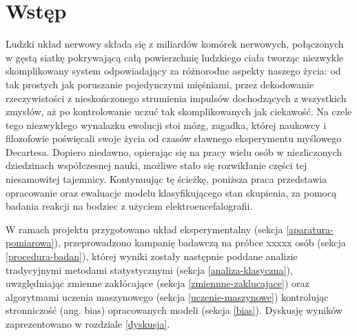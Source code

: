 \documentclass{./assets/wfis}
\begin{document}

\stronatytulowa

\begin{abstract}

\end{abstract}

\chapter{Wstęp}
Ludzki układ nerwowy składa się z miliardów komórek nerwowych, połączonych w gęstą siatkę pokrywającą całą powierzchnię ludzkiego ciała tworząc niezwykle skomplikowany system odpowiadający za różnorodne aspekty naszego życia: od tak prostych jak poruszanie pojedynczymi mięśniami, przez dekodowanie rzeczywistości z nieskończonego strumienia impulsów dochodzących z wszystkich zmysłów, aż po kontrolowanie uczuć tak skomplikowanych jak ciekawość. Na czele tego niezwykłego wynalazku ewolucji stoi mózg, zagadka, której naukowcy i filozofowie poświęcali swoje życia od czasów sławnego eksperymentu myślowego Decartesa. Dopiero niedawno, opierając się na pracy wielu osób w niezliczonych dziedzinach współczesnej nauki, możliwe stało się rozwikłanie części tej niesamowitej tajemnicy. Kontynuując tę ścieżkę, poniższa praca przedstawia opracowanie oraz ewaluacje modelu klasyfikującego stan skupienia, za pomocą badania reakcji na bodziec z użyciem elektroencefalografii. 

W ramach projektu przygotowano układ eksperymentalny (sekcja \ref{aparatura-pomiarowa}), przeprowadzono kampanię badawczą na próbce xxxxx osób (sekcja \ref{procedura-badan}), której wyniki zostały następnie poddane analizie tradycyjnymi metodami statystycznymi (sekcja \ref{analiza-klasyczna}), uwzględniając zmienne zakłócające (sekcja \ref{zmiennne-zaklucajace}) oraz algorytmami uczenia maszynowego (sekcja \ref{uczenie-maszynowe}) kontrolując stronniczość (ang. bias) opracowanych modeli (sekcja \ref{bias}). Dyskusję wyników zaprezentowano w rozdziale \ref{dyskusja}.
\end{document}
